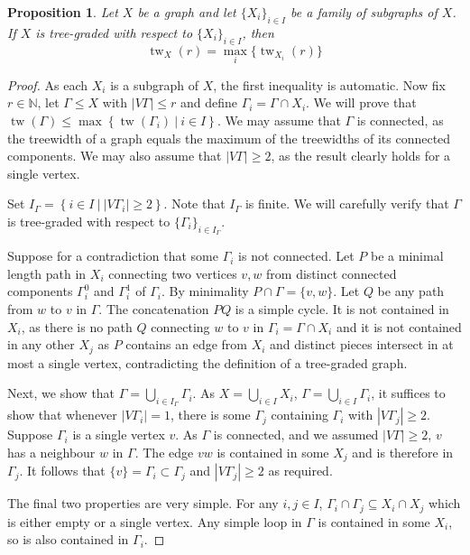 \documentclass[10pt,a4paper]{amsart}
\newtheorem{proposition}{Proposition}
\newcommand{\N}{\mathbb{N}}
\newcommand{\setcon}[2]{\left\{#1\ \left|\ #2\right.\right\}}
\DeclareMathOperator{\tw}{tw}
\begin{document}
\begin{proposition} Let $X$ be a graph and let $\{X_i\}_{i\in I}$ be a family of subgraphs of $X$. If $X$ is tree-graded with respect to $\{X_i\}_{i\in I}$, then
\[
    \tw_X(r)=\max_i \{\tw_{X_i}(r)\}
\]
\end{proposition}

\begin{proof}
    As each $X_i$ is a subgraph of $X$, the first inequality is automatic. Now fix $r\in \N$, let $\Gamma\leq X$ with $|V\Gamma|\leq r$ and define $\Gamma_i=\Gamma\cap X_i$. We will prove that $\tw(\Gamma)\leq\max\setcon{\tw(\Gamma_i)}{i\in I}$. 
    We may assume that $\Gamma$ is connected, as the treewidth of a graph equals the maximum of the treewidths of its connected components. We may also assume that $|V\Gamma|\geq 2$, as the result clearly holds for a single vertex.

    Set $I_\Gamma= \setcon{i\in I}{|V\Gamma_i|\geq 2}$. Note that $I_\Gamma$ is finite. We will carefully verify that $\Gamma$ is tree-graded with respect to $\{\Gamma_i\}_{i\in I_\Gamma}$. 

    Suppose for a contradiction that some $\Gamma_i$ is not connected. Let $P$ be a minimal length path in $X_i$ connecting two vertices $v,w$ from distinct connected components $\Gamma^0_i$ and $\Gamma^1_i$ of $\Gamma_i$. By minimality $P\cap \Gamma=\{v,w\}$. Let $Q$ be any path from $w$ to $v$ in $\Gamma$. The concatenation $PQ$ is a simple cycle. It is not contained in $X_i$, as there is no path $Q$ connecting $w$ to $v$ in $\Gamma_i=\Gamma\cap X_i$ and it is not contained in any other $X_j$ as $P$ contains an edge from $X_i$ and distinct pieces intersect in at most a single vertex, contradicting the definition of a tree-graded graph.

    Next, we show that $\Gamma=\bigcup_{i\in I_\Gamma} \Gamma_i$. As $X=\bigcup_{i\in I} X_i$, $\Gamma=\bigcup_{i\in I} \Gamma_i$, it suffices to show that whenever $|V\Gamma_i|=1$, there is some $\Gamma_j$ containing $\Gamma_i$ with $|V\Gamma_j|\geq 2$. Suppose $\Gamma_i$ is a single vertex $v$. As $\Gamma$ is connected, and we assumed $|V\Gamma|\geq 2$, $v$ has a neighbour $w$ in $\Gamma$. The edge $vw$ is contained in some $X_j$ and is therefore in $\Gamma_j$. It follows that $\{v\}=\Gamma_i\subset \Gamma_j$ and $|V\Gamma_j|\geq 2$ as required.

    The final two properties are very simple. For any $i,j\in I$, $\Gamma_i\cap\Gamma_j\subseteq X_i\cap X_j$ which is either empty or a single vertex. Any simple loop in $\Gamma$ is contained in some $X_i$, so is also contained in $\Gamma_i$.


\end{proof}
\end{document}
